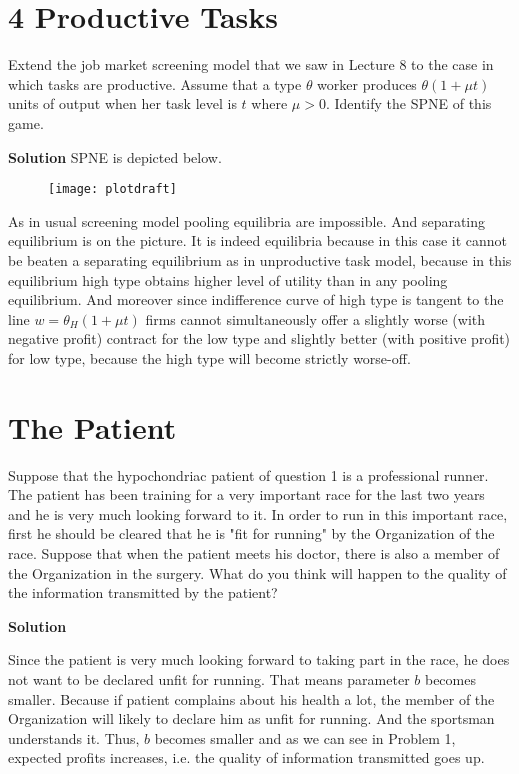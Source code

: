 \documentclass[a4paper]{article}
\begin{document}
\section*{4 Productive Tasks}
	Extend the job market screening model that we saw in Lecture 8 to the case in which
	tasks are productive. Assume that a type $\theta$ worker produces $\theta(1 + \mu t)$ units of output
	when her task level is $t$ where $\mu > 0$.
	Identify the SPNE of this game.
	
	
	\textbf{Solution}
	SPNE is depicted below.
	\begin{figure}[H]
		\centering
		\texttt{[image: plotdraft]}
		\caption{}\label{fig4}
	\end{figure}
	As in usual screening model pooling equilibria are impossible. And separating equilibrium is on the picture. It is indeed equilibria because in this case it cannot be beaten a separating equilibrium as in unproductive task model, because in this equilibrium high type obtains higher level of utility than in any pooling equilibrium. And moreover since indifference curve of high type is tangent to the line $w = \theta_H(1 + \mu t)$ firms cannot simultaneously offer a slightly worse (with negative profit) contract for the low type and slightly better (with positive profit) for low type, because the high type will become strictly worse-off.
	
	
	\section*{The Patient}
		Suppose that the hypochondriac patient of question 1 is a professional runner. The
		patient has been training for a very important race for the last two years and he is very
		much looking forward to it. In order to run in this important race, first he should be
		cleared that he is "fit for running" by the Organization of the race. Suppose that when
		the patient meets his doctor, there is also a member of the Organization in the surgery.
		What do you think will happen to the quality of the information transmitted by the
		patient?
		
		
		\textbf{Solution}
		
		Since the patient is very much looking forward to taking part in the race, he does not want to be declared unfit for running. That means parameter $b$ becomes smaller. Because if patient complains about his health a lot, the member of the Organization will likely to declare him as unfit for running. And the sportsman understands it. Thus, $b$ becomes smaller and as we can see in Problem 1, expected profits increases, i.e. the quality of information transmitted goes up.
		
\end{document}
